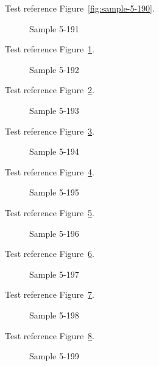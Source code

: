 Test reference Figure~\ref{fig:sample-5-190}.

\begin{figure}[tbhp]
\caption{Sample 5-191}
\label{fig:sample-5-191}
\end{figure}

Test reference Figure~\ref{fig:sample-5-191}.

\begin{figure}[tbhp]
\caption{Sample 5-192}
\label{fig:sample-5-192}
\end{figure}

Test reference Figure~\ref{fig:sample-5-192}.

\begin{figure}[tbhp]
\caption{Sample 5-193}
\label{fig:sample-5-193}
\end{figure}

Test reference Figure~\ref{fig:sample-5-193}.

\begin{figure}[tbhp]
\caption{Sample 5-194}
\label{fig:sample-5-194}
\end{figure}

Test reference Figure~\ref{fig:sample-5-194}.

\begin{figure}[tbhp]
\caption{Sample 5-195}
\label{fig:sample-5-195}
\end{figure}

Test reference Figure~\ref{fig:sample-5-195}.

\begin{figure}[tbhp]
\caption{Sample 5-196}
\label{fig:sample-5-196}
\end{figure}

Test reference Figure~\ref{fig:sample-5-196}.

\begin{figure}[tbhp]
\caption{Sample 5-197}
\label{fig:sample-5-197}
\end{figure}

Test reference Figure~\ref{fig:sample-5-197}.

\begin{figure}[tbhp]
\caption{Sample 5-198}
\label{fig:sample-5-198}
\end{figure}

Test reference Figure~\ref{fig:sample-5-198}.

\begin{figure}[tbhp]
\caption{Sample 5-199}
\label{fig:sample-5-199}
\end{figure}

